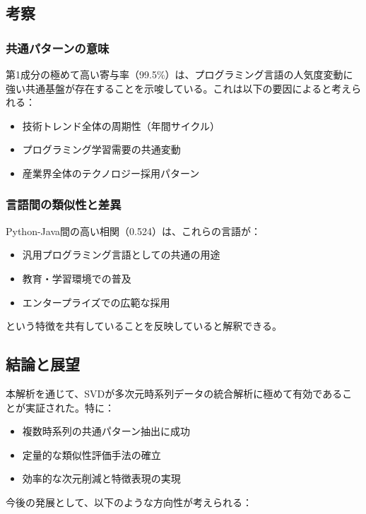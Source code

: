 \documentclass[a4paper,11pt]{jsarticle}
\begin{document}
\subsection{考察}

\subsubsection{共通パターンの意味}

第1成分の極めて高い寄与率（99.5\%）は、プログラミング言語の人気度変動に強い共通基盤が存在することを示唆している。これは以下の要因によると考えられる：

\begin{itemize}
  \item 技術トレンド全体の周期性（年間サイクル）
  \item プログラミング学習需要の共通変動
  \item 産業界全体のテクノロジー採用パターン
\end{itemize}

\subsubsection{言語間の類似性と差異}

Python-Java間の高い相関（0.524）は、これらの言語が：
\begin{itemize}
  \item 汎用プログラミング言語としての共通の用途
  \item 教育・学習環境での普及
  \item エンタープライズでの広範な採用
\end{itemize}
という特徴を共有していることを反映していると解釈できる。

\subsection{結論と展望}

本解析を通じて、SVDが多次元時系列データの統合解析に極めて有効であることが実証された。特に：

\begin{itemize}
  \item 複数時系列の共通パターン抽出に成功
  \item 定量的な類似性評価手法の確立
  \item 効率的な次元削減と特徴表現の実現
\end{itemize}

今後の発展として、以下のような方向性が考えられる：
\end{document}

